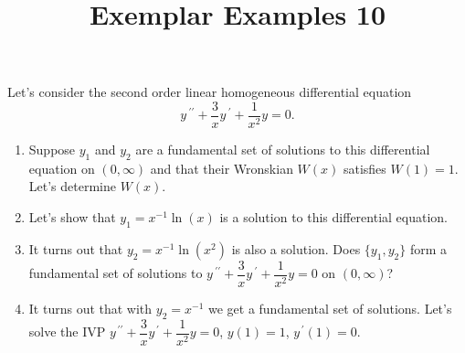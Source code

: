 \documentclass{ximera}
\begin{document}
\begin{abstract}
 \end{abstract}

    \title{Exemplar Examples 10}
    
    \maketitle

Let's consider the second order linear homogeneous differential equation $$\displaystyle y\,^{\prime\prime}+\dfrac{3}{x}y\,^{\prime}+\dfrac{1}{x^2}y=0.$$

\begin{enumerate}

\item Suppose $y_1$ and $y_2$ are a fundamental set of solutions to this differential equation on $(0,\infty)$ and that their Wronskian $W(x)$ satisfies $W(1)=1$.  Let's determine $W(x)$.

\vfill



\item Let's show that $y_1=x^{-1}\ln{(x)}$ is a solution to this differential equation.


\vfill

\item It turns out that $y_2=x^{-1}\ln{(x^2)}$ is also a solution.  Does $\{y_1,y_2\}$ form a fundamental set of solutions to $\displaystyle y\,^{\prime\prime}+\dfrac{3}{x}y\,^{\prime}+\dfrac{1}{x^2}y=0$ on $(0,\infty)$?

\vfill


\newpage

\item It turns out that with $y_2=x^{-1}$ we get a fundamental set of solutions. Let's solve the IVP $\displaystyle y^{\,\prime\prime}+\dfrac{3}{x}y^{\,\prime}+\dfrac{1}{x^2}y=0$, $y(1)=1$, $y^{\,\prime}(1)=0$.




\end{enumerate}
\end{document}
